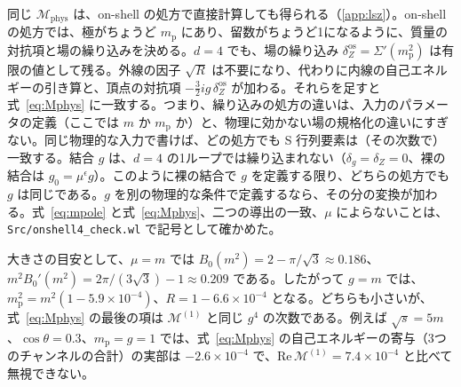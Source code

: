 \documentclass[a4paper,10pt]{ltjsarticle}
\begin{document}
同じ $\mathcal{M}_{\mathrm{phys}}$ は、on-shell の処方で直接計算しても得られる（\ref{app:lsz}）。on-shell の処方では、極がちょうど $m_{\mathrm p}$ にあり、留数がちょうど1になるように、質量の対抗項と場の繰り込みを決める。$d=4$ でも、場の繰り込み $\delta_Z^{\mathrm{os}}=\Sigma'(m_{\mathrm p}^2)$ は有限の値として残る。外線の因子 $\sqrt R$ は不要になり、代わりに内線の自己エネルギーの引き算と、頂点の対抗項 $-\frac32ig\,\delta_Z^{\mathrm{os}}$ が加わる。それらを足すと式~\eqref{eq:Mphys} に一致する。つまり、繰り込みの処方の違いは、入力のパラメータの定義（ここでは $m$ か $m_{\mathrm p}$ か）と、物理に効かない場の規格化の違いにすぎない。同じ物理的な入力で書けば、どの処方でも S 行列要素は（その次数で）一致する。結合 $g$ は、$d=4$ の1ループでは繰り込まれない（$\delta_g=\delta_Z=0$、裸の結合は $g_0=\mu^\epsilon g$）。このように裸の結合で $g$ を定義する限り、どちらの処方でも $g$ は同じである。$g$ を別の物理的な条件で定義するなら、その分の変換が加わる。式~\eqref{eq:mpole} と式~\eqref{eq:Mphys}、二つの導出の一致、$\mu$ によらないことは、\texttt{Src/onshell4\_check.wl} で記号として確かめた。

大きさの目安として、$\mu=m$ では $B_0(m^2)=2-\pi/\sqrt3\approx0.186$、$m^2B_0'(m^2)=2\pi/(3\sqrt3)-1\approx0.209$ である。したがって $g=m$ では、$m_{\mathrm p}^2=m^2(1-5.9\times10^{-4})$、$R=1-6.6\times10^{-4}$ となる。どちらも小さいが、式~\eqref{eq:Mphys} の最後の項は $\mathcal{M}^{(1)}$ と同じ $g^4$ の次数である。例えば $\sqrt s=5m$、$\cos\theta=0.3$、$m_{\mathrm p}=g=1$ では、式~\eqref{eq:Mphys} の自己エネルギーの寄与（3つのチャンネルの合計）の実部は $-2.6\times10^{-4}$ で、$\mathrm{Re}\,\mathcal{M}^{(1)}=7.4\times10^{-4}$ と比べて無視できない。
\end{document}
